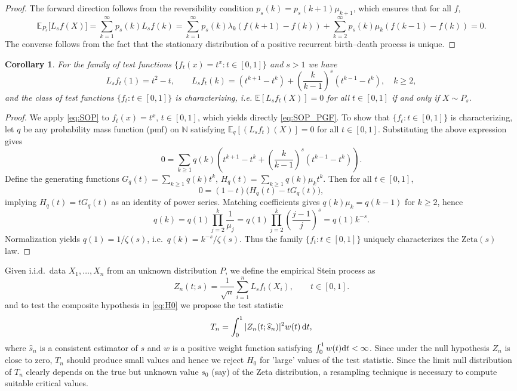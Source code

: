 \documentclass{article}
\theoremstyle{thm}
\newtheorem{corollary}[theorem]{Corollary}
\theoremstyle{def}
\begin{document}
\begin{proof}
The forward direction follows from the reversibility condition \(p_s(k) = p_s(k+1)\mu_{k+1}\),
which ensures that for all \(f\),
\[
\mathbb{E}_{P_s}\big[L_s f(X)\big]=\sum_{k=1}^\infty p_s(k) L_s f(k)
= \sum_{k=1}^\infty p_s(k)\lambda_k (f(k+1)-f(k))
  + \sum_{k=2}^\infty p_s(k)\mu_k (f(k-1)-f(k)) = 0.
\]
The converse follows from the fact that the stationary distribution of a positive recurrent birth–death process is unique.
\end{proof}
\begin{corollary}\label{cor:char}
For the family of test functions $\{f_t(x) = t^x: t\in[0,1]\}$ and $s>1$ we have
\begin{equation}\label{eq:SOP_PGF}
L_s f_t(1) = t^2 - t,
\qquad
L_s f_t(k)
= \left(t^{k+1}-t^k\right)
+ \left(\frac{k}{k-1}\right)^{s}(t^{k-1}-t^k),
\quad k \ge 2,
\end{equation}
and the class of test functions $\{f_t: t\in[0,1]\}$ is characterizing, i.e. $\mathbb{E}\left[L_s f_t(X)\right] = 0$ for all $t\in[0,1]$ if and only if $X\sim P_s$.
\end{corollary}
\begin{proof}
We apply \eqref{eq:SOP} to $f_t(x)=t^x$, $t\in[0,1]$, which yields directly \eqref{eq:SOP_PGF}. To show that $\{f_t:t\in[0,1]\}$ is characterizing, let $q$ be any probability mass function (pmf) on $\mathbb{N}$ satisfying
$\mathbb{E}_q[(L_s f_t)(X)]=0$ for all $t\in[0,1]$.
Substituting the above expression gives
\[
0=\sum_{k\ge1} q(k)\left(t^{k+1}-t^k + \left(\frac{k}{k-1}\right)^s \left(t^{k-1}-t^k\right)\right).
\]
Define  the generating functions
$G_q(t)=\sum_{k\ge1} q(k)t^k$,
$H_q(t)=\sum_{k\ge1} q(k)\mu_k t^k$.
Then for all $t\in[0,1]$,
\[
0=(1-t)\big(H_q(t)-tG_q(t)\big),
\]
implying $H_q(t)=tG_q(t)$ as an identity of power series.
Matching coefficients gives $q(k)\mu_k=q(k-1)$ for $k\ge2$, hence
\[
q(k)=q(1)\prod_{j=2}^k \frac{1}{\mu_j}
= q(1)\prod_{j=2}^k \left(\frac{j-1}{j}\right)^s
= q(1)k^{-s}.
\]
Normalization yields $q(1)=1/\zeta(s)$, i.e.\ $q(k)=k^{-s}/\zeta(s)$.
Thus the family $\{f_t:t\in[0,1]\}$ uniquely characterizes the $\mathrm{Zeta}(s)$ law.
\end{proof}

Given i.i.d.\ data \(X_1,\dots,X_n\) from an unknown distribution \(P\), we define
the empirical Stein process as
\[
Z_n(t;s) = \frac{1}{\sqrt{n}} \sum_{i=1}^n L_s f_t(X_i), \qquad t\in[0,1].
\]
and to test the composite hypothesis in \eqref{eq:H0} we propose the test statistic
\begin{equation}\label{eq:test_statistic}
T_n = \int_0^1 |Z_n(t;\widehat{s}_n)|^2 w(t)\,{\rm d}t,
\end{equation}
where $\widehat{s}_n$ is a consistent estimator of $s$ and $w$ is a positive weight function satisfying $\int_0^1w(t){\rm d}t<\infty$. Since under the null hypothesis $Z_n$ is close to zero, $T_n$ should produce small values and hence we reject $H_0$ for 'large' values of the test statistic. Since the limit null distribution of $T_n$ clearly depends on the true but unknown value $s_0$ (say) of the Zeta distribution, a resampling technique is necessary to compute suitable critical values.
\end{document}
